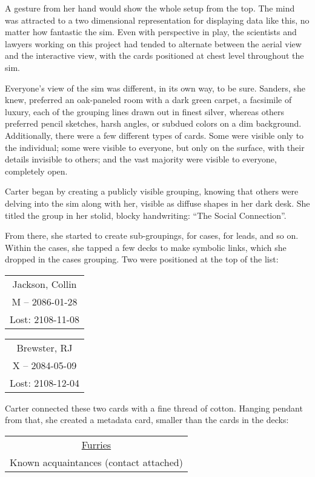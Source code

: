 A gesture from her hand would show the whole setup from the top.  The mind was attracted to a two dimensional representation for displaying data like this, no matter how fantastic the sim.  Even with perspective in play, the scientists and lawyers working on this project had tended to alternate between the aerial view and the interactive view, with the cards positioned at chest level throughout the sim.

Everyone's view of the sim was different, in its own way, to be sure.  Sanders, she knew, preferred an oak-paneled room with a dark green carpet, a facsimile of luxury, each of the grouping lines drawn out in finest silver, whereas others preferred pencil sketches, harsh angles, or subdued colors on a dim background.  Additionally, there were a few different types of cards.  Some were visible only to the individual; some were visible to everyone, but only on the surface, with their details invisible to others; and the vast majority were visible to everyone, completely open.

Carter began by creating a publicly visible grouping, knowing that others were delving into the sim along with her, visible as diffuse shapes in her dark desk.  She titled the group in her stolid, blocky handwriting: ``The Social Connection''.

From there, she started to create sub-groupings, for cases, for leads, and so on.  Within the cases, she tapped a few decks to make symbolic links, which she dropped in the cases grouping.  Two were positioned at the top of the list:

\begin{tabular}{|c|}
  \hline
  Jackson, Collin\\
  M -- 2086-01-28\\
  Lost: 2108-11-08\\
  \hline
\end{tabular}
\begin{tabular}{|c|}
  \hline
  Brewster, RJ\\
  X -- 2084-05-09\\
  Lost: 2108-12-04\\
  \hline
\end{tabular}

Carter connected these two cards with a fine thread of cotton.  Hanging pendant from that, she created a metadata card, smaller than the cards in the decks:

\begin{tabular}{|c|}
  \hline
  \underline{Furries}\\
  Known acquaintances (contact attached)\\
  \hline
\end{tabular}

